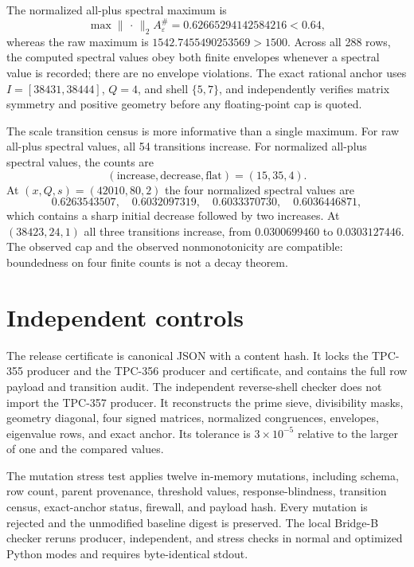 \documentclass[10pt]{article}
\newcommand{\opnorm}{\lVert\,\cdot\,\rVert_2}
\begin{document}
The normalized all-plus spectral maximum is
\begin{equation}
 \max\opnorm{A_\varepsilon^\#}=0.62665294142584216<0.64,
 \label{eq:cap}
\end{equation}
whereas the raw maximum is
$1542.7455490253569>1500$.  Across all 288 rows, the computed spectral
values obey both finite envelopes whenever a spectral value is recorded;
there are no envelope violations.  The exact rational anchor uses
$I=[38431,38444]$, $Q=4$, and shell $\{5,7\}$, and independently verifies
matrix symmetry and positive geometry before any floating-point cap is
quoted.

The scale transition census is more informative than a single maximum.  For
raw all-plus spectral values, all 54 transitions increase.  For normalized
all-plus spectral values, the counts are
\[
 (\text{increase},\text{decrease},\text{flat})=(15,35,4).
\]
At $(x,Q,s)=(42010,80,2)$ the four normalized spectral values are
\[
 0.6263543507,\quad 0.6032097319,\quad
 0.6033370730,\quad 0.6036446871,
\]
which contains a sharp initial decrease followed by two increases.  At
$(38423,24,1)$ all three transitions increase, from
$0.0300699460$ to $0.0303127446$.  The observed cap and the observed
nonmonotonicity are compatible: boundedness on four finite counts is not a
decay theorem.

\section{Independent controls}

The release certificate is canonical JSON with a content hash.  It locks the
TPC-355 producer and the TPC-356 producer and certificate, and contains the
full row payload and transition audit.  The independent reverse-shell checker
does not import the TPC-357 producer.  It reconstructs the prime sieve,
divisibility masks, geometry diagonal, four signed matrices, normalized
congruences, envelopes, eigenvalue rows, and exact anchor.  Its tolerance is
$3\times10^{-5}$ relative to the larger of one and the compared values.

The mutation stress test applies twelve in-memory mutations, including
schema, row count, parent provenance, threshold values, response-blindness,
transition census, exact-anchor status, firewall, and payload hash.  Every
mutation is rejected and the unmodified baseline digest is preserved.  The
local Bridge-B checker reruns producer, independent, and stress checks in
normal and optimized Python modes and requires byte-identical stdout.
\end{document}
